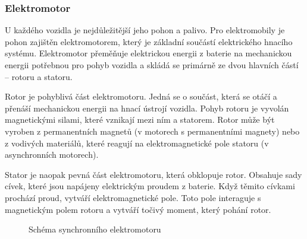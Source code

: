 \documentclass[a4paper,11pt]{article}
\begin{document}
\subsubsection{Elektromotor}
U každého vozidla je nejdůležitější jeho pohon a palivo. Pro elektromobily je pohon zajištěn 
elektromotorem, který je základní součástí elektrického hnacího systému. Elektromotor přeměňuje 
elektrickou energii z baterie na mechanickou energii potřebnou pro pohyb vozidla a skládá se 
primárně ze dvou hlavních částí -- rotoru a statoru. \cite{typy_elektromotoru}

Rotor je pohyblivá část elektromotoru. Jedná se o součást, která se otáčí a přenáší mechanickou 
energii na hnací ústrojí vozidla. Pohyb rotoru je vyvolán magnetickými silami, které vznikají mezi 
ním a statorem. Rotor může být vyroben z permanentních magnetů (v motorech s permanentními magnety) 
nebo z vodivých materiálů, které reagují na elektromagnetické pole statoru (v asynchronních motorech). \cite{elektromotor}

Stator je naopak pevná část elektromotoru, která obklopuje rotor. Obsahuje sady cívek, které jsou 
napájeny elektrickým proudem z baterie. Když těmito cívkami prochází proud, vytváří elektromagnetické 
pole. Toto pole interaguje s magnetickým polem rotoru a vytváří točivý moment, který pohání rotor. \cite{elektromotor}

\begin{figure}[H]
    \centering
    \caption{Schéma synchronního elektromotoru \cite{elektromotor}}
    \label{figure:synchroni-elektromotor}
\end{figure}
\end{document}
